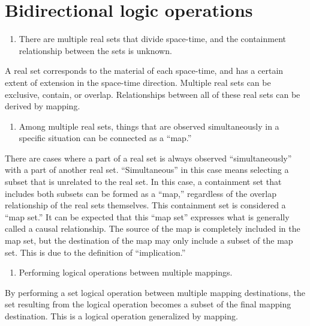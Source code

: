 \documentclass[12pt]{article}
\begin{document}
\section{Bidirectional logic operations}\label{bidirectional-logic-operations}

\begin{enumerate}
\def\labelenumi{\arabic{enumi}.}

\item
  There are multiple real sets that divide space-time, and the
  containment relationship between the sets is unknown.
\end{enumerate}

A real set corresponds to the material of each space-time, and has a
certain extent of extension in the space-time direction. Multiple real
sets can be exclusive, contain, or overlap. Relationships between all of
these real sets can be derived by mapping.

\begin{enumerate}
\def\labelenumi{\arabic{enumi}.}
\setcounter{enumi}{1}

\item
  Among multiple real sets, things that are observed simultaneously in a
  specific situation can be connected as a ``map.''
\end{enumerate}

There are cases where a part of a real set is always observed
``simultaneously'' with a part of another real set. ``Simultaneous'' in
this case means selecting a subset that is unrelated to the real set. In
this case, a containment set that includes both subsets can be formed as
a ``map,'' regardless of the overlap relationship of the real sets
themselves. This containment set is considered a ``map set.'' It can be
expected that this ``map set'' expresses what is generally called a
causal relationship. The source of the map is completely included in the
map set, but the destination of the map may only include a subset of the
map set. This is due to the definition of ``implication.''

\begin{enumerate}
\def\labelenumi{\arabic{enumi}.}
\setcounter{enumi}{2}

\item
  Performing logical operations between multiple mappings.
\end{enumerate}

By performing a set logical operation between multiple mapping
destinations, the set resulting from the logical operation becomes a
subset of the final mapping destination. This is a logical operation
generalized by mapping.
\end{document}
